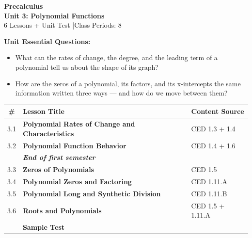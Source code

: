 \documentclass[10pt]{article}
\begin{document}
\thispagestyle{empty}

\vspace{-1.05in}

\begin{center}
  {\color{white}\textbf{\LARGE Precalculus}}\\[6pt]
  {\color{lilacmid}\Large\textbf{Unit 3: Polynomial Functions}}\\[4pt]
  {\color{white}\small 6 Lessons + Unit Test \quad|\quad Class Periods: 8}
\end{center}

\vspace{0.26in}

\begin{tcolorbox}[colback=goldbg, colframe=goldacc, boxrule=0.8pt, arc=2mm,
    left=3mm, right=3mm, top=2mm, bottom=2mm]
\small\textbf{Unit Essential Questions:}
\begin{itemize}[leftmargin=1.4em, itemsep=2pt, topsep=2pt]
  \item What can the rates of change, the degree, and the leading term of a polynomial tell us about the shape of its graph?
  \item How are the zeros of a polynomial, its factors, and its x-intercepts the same information written three ways --- and how do we move between them?
\end{itemize}
\end{tcolorbox}

\vspace{0.14in}

\begin{tocbox}
\small
\renewcommand{\arraystretch}{1.45}
\begin{tabularx}{\linewidth}{@{} c >{\bfseries}X l @{}}
\rowcolor{lilac}
\textbf{\#} & \textbf{Lesson Title} & \textbf{Content Source} \\
\midrule
3.1 & Polynomial Rates of Change and Characteristics & CED 1.3 + 1.4 \\
3.2 & Polynomial Function Behavior & CED 1.4 + 1.6 \\
    & \textit{End of first semester} & \\
3.3 & Zeros of Polynomials & CED 1.5 \\
3.4 & Polynomial Zeros and Factoring & CED 1.11.A \\
3.5 & Polynomial Long and Synthetic Division & CED 1.11.B \\
3.6 & Roots and Polynomials & CED 1.5 + 1.11.A \\
\midrule
\rowcolor{lilac}
     & \textbf{Sample Test} &      \\
\end{tabularx}
\end{tocbox}
\end{document}
